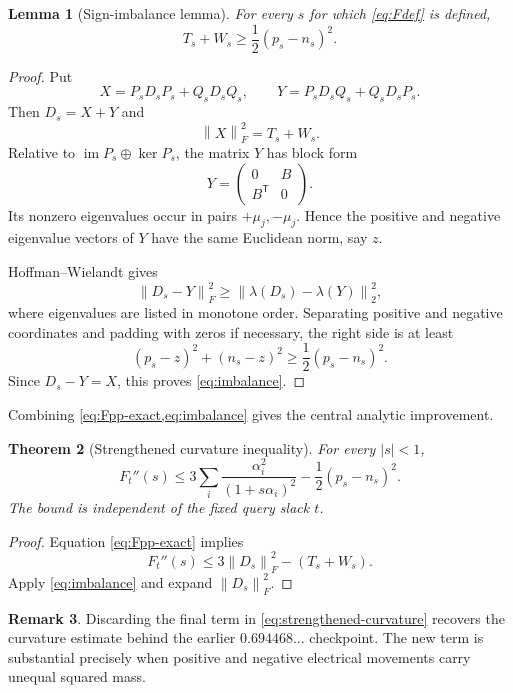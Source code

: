 \documentclass[11pt]{article}
\newtheorem{theorem}{Theorem}[section]
\newtheorem{lemma}[theorem]{Lemma}
\theoremstyle{definition}
\newtheorem{remark}[theorem]{Remark}
\newcommand{\im}{\operatorname{im}}
\newcommand{\norm}[1]{\left\lVert #1\right\rVert}
\begin{document}
\begin{lemma}[Sign-imbalance lemma]
For every $s$ for which \cref{eq:Fdef} is defined,
\begin{equation}
  \boxed{T_s+W_s\ge\frac12(p_s-n_s)^2.}
  \label{eq:imbalance}
\end{equation}
\end{lemma}

\begin{proof}
Put
\[
  X=P_sD_sP_s+Q_sD_sQ_s,
  \qquad
  Y=P_sD_sQ_s+Q_sD_sP_s.
\]
Then $D_s=X+Y$ and
\[
  \norm{X}_F^2=T_s+W_s.
\]
Relative to $\im P_s\oplus\ker P_s$, the matrix $Y$ has block form
\[
  Y=\begin{pmatrix}0&B\\B^{\mathsf T}&0\end{pmatrix}.
\]
Its nonzero eigenvalues occur in pairs $+\mu_j,-\mu_j$.  Hence the positive and negative eigenvalue vectors of $Y$ have the same Euclidean norm, say $z$.

Hoffman--Wielandt gives
\[
  \norm{D_s-Y}_F^2
  \ge \norm{\lambda(D_s)-\lambda(Y)}_2^2,
\]
where eigenvalues are listed in monotone order.  Separating positive and negative coordinates and padding with zeros if necessary, the right side is at least
\[
  (p_s-z)^2+(n_s-z)^2
  \ge \frac12(p_s-n_s)^2.
\]
Since $D_s-Y=X$, this proves \cref{eq:imbalance}.
\end{proof}

Combining \cref{eq:Fpp-exact,eq:imbalance} gives the central analytic improvement.

\begin{theorem}[Strengthened curvature inequality]
For every $|s|<1$,
\begin{equation}
  \boxed{
  F_t''(s)
  \le
  3\sum_i\frac{\alpha_i^2}{(1+s\alpha_i)^2}
  -\frac12(p_s-n_s)^2.
  }
  \label{eq:strengthened-curvature}
\end{equation}
The bound is independent of the fixed query slack $t$.
\end{theorem}

\begin{proof}
Equation \cref{eq:Fpp-exact} implies
\[
  F_t''(s)
  \le 3\norm{D_s}_F^2-(T_s+W_s).
\]
Apply \cref{eq:imbalance} and expand $\norm{D_s}_F^2$.
\end{proof}

\begin{remark}
Discarding the final term in \cref{eq:strengthened-curvature} recovers the curvature estimate behind the earlier $0.694468\ldots$ checkpoint.  The new term is substantial precisely when positive and negative electrical movements carry unequal squared mass.
\end{remark}
\end{document}

